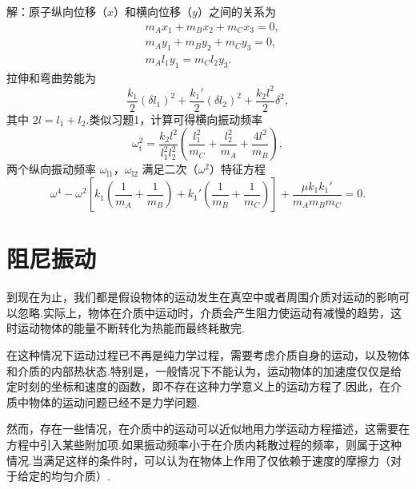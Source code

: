 \begin{xiti}
解：原子纵向位移（$x$）和横向位移（$y$）之间的关系为
\begin{equation*}
\begin{aligned}
  &m_Ax_1+m_Bx_2+m_Cx_3=0,\\
  &m_Ay_1+m_By_2+m_Cy_3=0,\\
  &m_Al_1y_1=m_Cl_2y_3.
\end{aligned}
\end{equation*}
拉伸和弯曲势能为
\begin{equation*}
  \frac{k_1}{2}\left(\delta l_1\right)^2+\frac{k_1'}{2}\left(\delta l_2\right)^2
  +\frac{k_2l^2}{2}\delta^2,
\end{equation*}
其中 $2l=l_1+l_2$.类似习题1，计算可得横向振动频率
\begin{equation*}
  \omega_{\mathrm{t}}^2=\frac{k_2l^2}{l_1^2l_2^2}
  \left(\frac{l_1^2}{m_C}+\frac{l_2^2}{m_A}+\frac{4l^2}{m_B}\right),
\end{equation*}
两个纵向振动频率 $\omega_{\mathrm{l1}}$，$\omega_{\mathrm{l2}}$ 满足二次（$\omega^2$）特征方程
\begin{equation*}
  \omega^4-\omega^2\left[k_1\left(\frac{1}{m_A}+\frac{1}{m_B}\right)
  +k_1'\left(\frac{1}{m_B}+\frac{1}{m_C}\right)\right]
  +\frac{\mu k_1k_1'}{m_Am_Bm_C}=0.
\end{equation*}

\end{xiti}

\section{阻尼振动}

到现在为止，我们都是假设物体的运动发生在真空中或者周围介质对运动的影响可以忽略.实际上，物体在介质中运动时，介质会产生阻力使运动有减慢的趋势，这时运动物体的能量不断转化为热能而最终耗散完.

在这种情况下运动过程已不再是纯力学过程，需要考虑介质自身的运动，以及物体和介质的内部热状态.特别是，一般情况下不能认为，运动物体的加速度仅仅是给定时刻的坐标和速度的函数，即不存在这种力学意义上的运动方程了.因此，在介质中物体的运动问题已经不是力学问题.

然而，存在一些情况，在介质中的运动可以近似地用力学运动方程描述，这需要在方程中引入某些附加项.如果振动频率小于在介质内耗散过程的频率，则属于这种情况.当满足这样的条件时，可以认为在物体上作用了仅依赖于速度的摩擦力（对于给定的均匀介质）.

